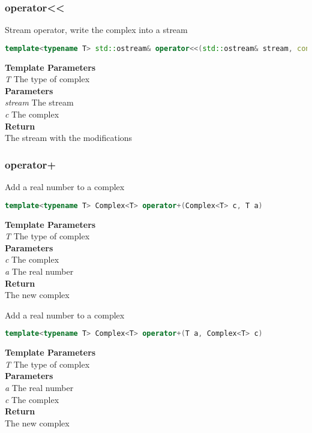 \subsubsection{operator<<}
\begin{mdframed}
Stream operator, write the complex into a stream
\begin{lstlisting}[language=C++]
template<typename T> std::ostream& operator<<(std::ostream& stream, const Complex<T>& c) 
\end{lstlisting}
\textbf{Template Parameters} \\ 
\textit{T} The type of complex \\ 
\textbf{Parameters} \\ 
\textit{stream} The stream \\ 
\textit{c} The complex \\ 
\textbf{Return} \\ 
The stream with the modifications\\ 
\end{mdframed}

\subsubsection{operator+}
\begin{mdframed}
Add a real number to a complex
\begin{lstlisting}[language=C++]
template<typename T> Complex<T> operator+(Complex<T> c, T a) 
\end{lstlisting}
\textbf{Template Parameters} \\ 
\textit{T} The type of complex \\ 
\textbf{Parameters} \\ 
\textit{c} The complex \\ 
\textit{a} The real number \\ 
\textbf{Return} \\ 
The new complex\\ 
\end{mdframed}

\begin{mdframed}
Add a real number to a complex
\begin{lstlisting}[language=C++]
template<typename T> Complex<T> operator+(T a, Complex<T> c) 
\end{lstlisting}
\textbf{Template Parameters} \\ 
\textit{T} The type of complex \\ 
\textbf{Parameters} \\ 
\textit{a} The real number \\ 
\textit{c} The complex \\ 
\textbf{Return} \\ 
The new complex\\ 
\end{mdframed}

